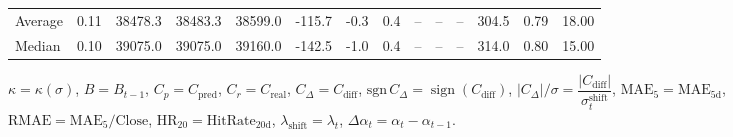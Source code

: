 \begin{threeparttable}
{\begin{tabular}{lrrrrrrrrrrrrr}
Average &     0.11 & 38478.3 & 38483.3 & 38599.0 &     -115.7 &                     -0.3 &                 0.4 &         -- &        -- &             -- &            304.5 &            0.79 &                  18.00 \\
 Median &     0.10 & 39075.0 & 39075.0 & 39160.0 &     -142.5 &                     -1.0 &                 0.4 &         -- &        -- &             -- &            314.0 &            0.80 &                  15.00 \\
\bottomrule
\end{tabular}
}
\begin{tablenotes}\footnotesize
\item $\kappa=\kappa(\sigma)$, $B=B_{t-1}$, $C_p=C_{\text{pred}}$, $C_r=C_{\text{real}}$, $C_\Delta=C_{\text{diff}}$, $\mathrm{sgn}\,C_\Delta=\operatorname{sign}(C_{\text{diff}})$, $|C_\Delta|/\sigma=\dfrac{|C_{\text{diff}}|}{\sigma_t^{\text{shift}}}$, $\mathrm{MAE}_5=\mathrm{MAE}_{5\text{d}}$, $\mathrm{RMAE}= \mathrm{MAE}_5 / \text{Close}$, $\mathrm{HR}_{20}=\mathrm{HitRate}_{20\text{d}}$, 
$\lambda_{\text{shift}}=\lambda_t$, 
$\Delta\alpha_t=\alpha_t-\alpha_{t-1}$.
\end{tablenotes}
\end{threeparttable}
\endgroup


